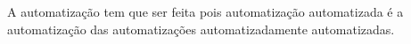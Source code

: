 A automatização tem que ser feita pois automatização automatizada é a automatização das automatizações automatizadamente automatizadas.